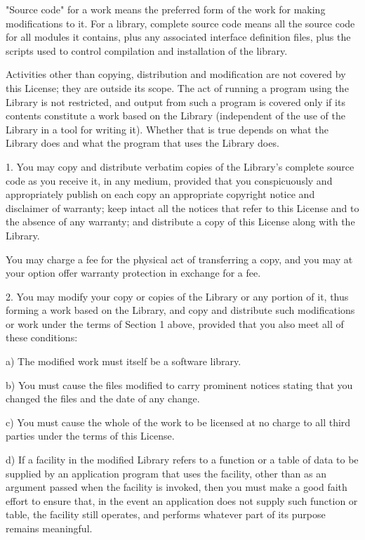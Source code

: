 "Source code" for a work means the preferred form of the work for making
modifications to it.  For a library, complete source code means all the
source code for all modules it contains, plus any associated interface
definition files, plus the scripts used to control compilation and
installation of the library.

Activities other than copying, distribution and modification are not covered
by this License; they are outside its scope.  The act of running a program
using the Library is not restricted, and output from such a program is
covered only if its contents constitute a work based on the Library
(independent of the use of the Library in a tool for writing it).  Whether
that is true depends on what the Library does and what the program that uses
the Library does.

1. You may copy and distribute verbatim copies of the Library's complete
source code as you receive it, in any medium, provided that you conspicuously
and appropriately publish on each copy an appropriate copyright notice and
disclaimer of warranty; keep intact all the notices that refer to this
License and to the absence of any warranty; and distribute a copy of this
License along with the Library.

You may charge a fee for the physical act of transferring a copy, and you may
at your option offer warranty protection in exchange for a fee.

2. You may modify your copy or copies of the Library or any portion of it,
thus forming a work based on the Library, and copy and distribute such
modifications or work under the terms of Section 1 above, provided that you
also meet all of these conditions:

  a) The modified work must itself be a software library.

  b) You must cause the files modified to carry prominent notices
  stating that you changed the files and the date of any change.

  c) You must cause the whole of the work to be licensed at no
  charge to all third parties under the terms of this License.

  d) If a facility in the modified Library refers to a function or a
  table of data to be supplied by an application program that uses
  the facility, other than as an argument passed when the facility
  is invoked, then you must make a good faith effort to ensure that,
  in the event an application does not supply such function or
  table, the facility still operates, and performs whatever part of
  its purpose remains meaningful.

